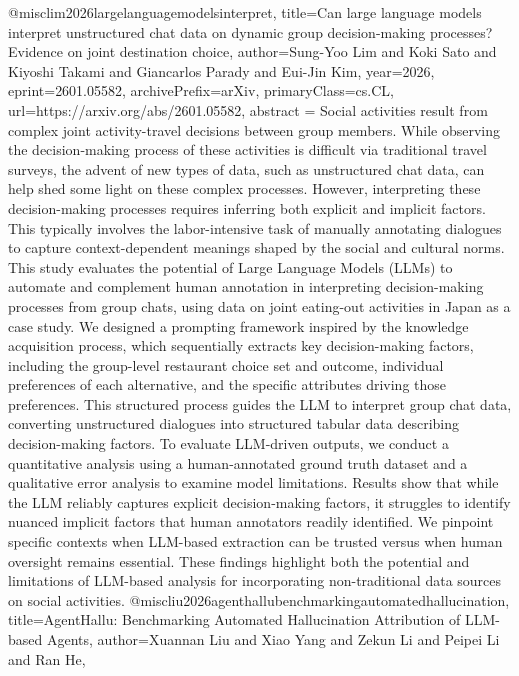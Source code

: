{}@misc{lim2026largelanguagemodelsinterpret,
      title={Can large language models interpret unstructured chat data on dynamic group decision-making processes? Evidence on joint destination choice}, 
      author={Sung-Yoo Lim and Koki Sato and Kiyoshi Takami and Giancarlos Parady and Eui-Jin Kim},
      year={2026},
      eprint={2601.05582},
      archivePrefix={arXiv},
      primaryClass={cs.CL},
      url={https://arxiv.org/abs/2601.05582},
      abstract = {Social activities result from complex joint activity-travel decisions between group members. While observing the decision-making process of these activities is difficult via traditional travel surveys, the advent of new types of data, such as unstructured chat data, can help shed some light on these complex processes. However, interpreting these decision-making processes requires inferring both explicit and implicit factors. This typically involves the labor-intensive task of manually annotating dialogues to capture context-dependent meanings shaped by the social and cultural norms. This study evaluates the potential of Large Language Models (LLMs) to automate and complement human annotation in interpreting decision-making processes from group chats, using data on joint eating-out activities in Japan as a case study. We designed a prompting framework inspired by the knowledge acquisition process, which sequentially extracts key decision-making factors, including the group-level restaurant choice set and outcome, individual preferences of each alternative, and the specific attributes driving those preferences. This structured process guides the LLM to interpret group chat data, converting unstructured dialogues into structured tabular data describing decision-making factors. To evaluate LLM-driven outputs, we conduct a quantitative analysis using a human-annotated ground truth dataset and a qualitative error analysis to examine model limitations. Results show that while the LLM reliably captures explicit decision-making factors, it struggles to identify nuanced implicit factors that human annotators readily identified. We pinpoint specific contexts when LLM-based extraction can be trusted versus when human oversight remains essential. These findings highlight both the potential and limitations of LLM-based analysis for incorporating non-traditional data sources on social activities.}
}@misc{liu2026agenthallubenchmarkingautomatedhallucination,
      title={AgentHallu: Benchmarking Automated Hallucination Attribution of LLM-based Agents}, 
      author={Xuannan Liu and Xiao Yang and Zekun Li and Peipei Li and Ran He},
}
